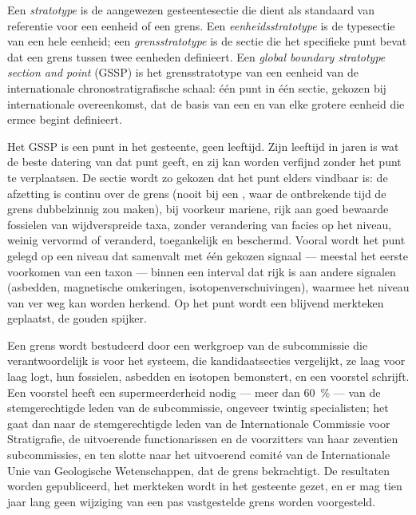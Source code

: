 \begin{definition}\label{def:b1:stratigraphic-scale:gssp}
Een \emph{stratotype} is de aangewezen gesteentesectie die dient als standaard van referentie voor een eenheid of een grens. Een \emph{eenheidsstratotype} is de typesectie van een hele eenheid; een \emph{grensstratotype} is de sectie die het specifieke punt bevat dat een grens tussen twee eenheden definieert. Een \emph{global boundary
stratotype section and point} (GSSP) is het grensstratotype van een eenheid van de internationale chronostratigrafische schaal: één punt in één sectie, gekozen bij internationale overeenkomst, dat de basis van een  en van elke grotere eenheid die ermee begint definieert.
\end{definition}

Het GSSP is een punt in het gesteente, geen leeftijd. Zijn leeftijd in jaren is wat de beste datering van dat punt geeft, en zij kan worden verfijnd zonder het punt te verplaatsen. De sectie wordt zo gekozen dat het punt elders vindbaar is: de afzetting is continu over de grens (nooit bij een , waar de ontbrekende tijd de grens dubbelzinnig zou maken), bij voorkeur mariene, rijk aan goed bewaarde fossielen van wijdverspreide taxa, zonder verandering van facies op het niveau, weinig vervormd of veranderd, toegankelijk en beschermd. Vooral wordt het punt gelegd op een niveau dat samenvalt met één gekozen signaal --- meestal het eerste voorkomen van een taxon --- binnen een interval dat rijk is aan andere signalen (asbedden, magnetische omkeringen, isotopenverschuivingen), waarmee het niveau van ver weg kan worden herkend. Op het punt wordt een blijvend merkteken geplaatst, de gouden spijker.

\begin{inthefield}
Een grens wordt bestudeerd door een werkgroep van de subcommissie die verantwoordelijk is voor het systeem, die kandidaatsecties vergelijkt, ze laag voor laag logt, hun fossielen, asbedden en isotopen bemonstert, en een voorstel schrijft. Een voorstel heeft een supermeerderheid nodig --- meer dan \qty{60}{\%} --- van de stemgerechtigde leden van de subcommissie, ongeveer twintig specialisten; het gaat dan naar de stemgerechtigde leden van de Internationale Commissie voor Stratigrafie, de uitvoerende functionarissen en de voorzitters van haar zeventien subcommissies, en ten slotte naar het uitvoerend comité van de Internationale Unie van Geologische Wetenschappen, dat de grens bekrachtigt. De resultaten worden gepubliceerd, het merkteken wordt in het gesteente gezet, en er mag tien jaar lang geen wijziging van een pas vastgestelde grens worden voorgesteld.
\end{inthefield}

